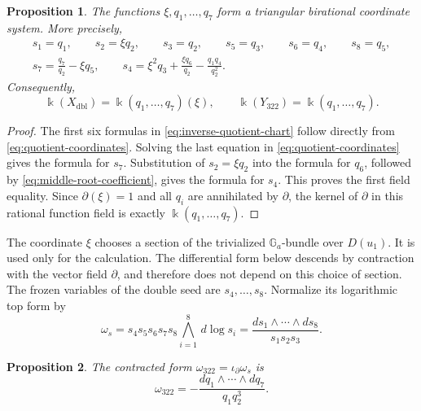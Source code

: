\documentclass[11pt,reqno]{amsart}
\numberwithin{equation}{section}
\newtheorem{proposition}[proposition]{Proposition}
\theoremstyle{remark}
\newcommand{\kk}{\Bbbk}
\newcommand{\dlog}{\,d\!\log}
\begin{document}
\begin{proposition}
\label{prop:birational-quotient-chart}
The functions $\xi,q_1,\ldots,q_7$ form a triangular birational coordinate
system.  More precisely,
\begin{equation}
\label{eq:inverse-quotient-chart}
 \begin{gathered}
 s_1=q_1,\qquad s_2=\xi q_2,\qquad s_3=q_2,
 \qquad s_5=q_3,\qquad s_6=q_4,\qquad s_8=q_5,\\
 s_7=\frac{q_7}{q_2}-\xi q_5,
 \qquad
 s_4=\xi^2q_3+\frac{\xi q_6}{q_2}-\frac{q_1q_4}{q_2^2}.
 \end{gathered}
\end{equation}
Consequently,
\[ \kk(X_{\mathrm{dbl}})=\kk(q_1,\ldots,q_7)(\xi), \qquad \kk(Y_{322})=\kk(q_1,\ldots,q_7). \]
\end{proposition}

\begin{proof}
The first six formulas in \eqref{eq:inverse-quotient-chart} follow directly
from \eqref{eq:quotient-coordinates}.  Solving the last equation in
\eqref{eq:quotient-coordinates} gives the formula for $s_7$.  Substitution
of $s_2=\xi q_2$ into the formula for $q_6$, followed by
\eqref{eq:middle-root-coefficient}, gives the formula for $s_4$.  This
proves the first field equality.  Since $\partial(\xi)=1$ and all $q_i$ are
annihilated by $\partial$, the kernel of $\partial$ in this rational function field is
exactly $\kk(q_1,\ldots,q_7)$.
\end{proof}

The coordinate $\xi$ chooses a section of the trivialized
$\mathbb G_a$-bundle over $D(u_1)$.  It is used only for the calculation.
The differential form below descends by contraction with the vector field
$\partial$, and therefore does not depend on this choice of section.
The frozen variables of the double seed are $s_4,\ldots,s_8$.  Normalize
its logarithmic top form by
\begin{equation}
\label{eq:double-log-volume}
 \omega_s
 =s_4s_5s_6s_7s_8\bigwedge_{i=1}^8\dlog s_i
 =\frac{ds_1\wedge\cdots\wedge ds_8}{s_1s_2s_3}.
\end{equation}

\begin{proposition}
\label{prop:quotient-volume}
The contracted form $\omega_{322}=\iota_{\partial}\omega_s$ is
\begin{equation}
\label{eq:quotient-volume}
 \omega_{322}
 =-\frac{dq_1\wedge\cdots\wedge dq_7}{q_1q_2^3}.
\end{equation}
\end{proposition}
\end{document}
